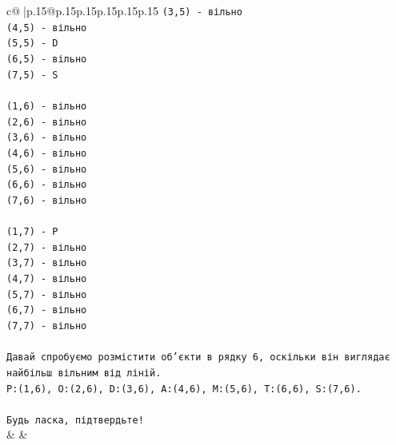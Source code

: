 \documentclass{article}
\begin{document}
{\begin{supertabular}{c@{$\;$}|p{.15\linewidth}@{}p{.15\linewidth}p{.15\linewidth}p{.15\linewidth}p{.15\linewidth}p{.15\linewidth}}
{{{\texttt{(3,5) {-} вільно} \\
\texttt{(4,5) {-} вільно} \\
\texttt{(5,5) {-} D} \\
\texttt{(6,5) {-} вільно} \\
\texttt{(7,5) {-} S} \\
\\ 
\texttt{(1,6) {-} вільно} \\
\texttt{(2,6) {-} вільно} \\
\texttt{(3,6) {-} вільно} \\
\texttt{(4,6) {-} вільно} \\
\texttt{(5,6) {-} вільно} \\
\texttt{(6,6) {-} вільно} \\
\texttt{(7,6) {-} вільно} \\
\\ 
\texttt{(1,7) {-} P} \\
\texttt{(2,7) {-} вільно} \\
\texttt{(3,7) {-} вільно} \\
\texttt{(4,7) {-} вільно} \\
\texttt{(5,7) {-} вільно} \\
\texttt{(6,7) {-} вільно} \\
\texttt{(7,7) {-} вільно} \\
\\ 
\texttt{Давай спробуємо розмістити об'єкти в рядку 6, оскільки він виглядає найбільш вільним від ліній.} \\
\texttt{P:(1,6), O:(2,6), D:(3,6), A:(4,6), M:(5,6), T:(6,6), S:(7,6).} \\
\\ 
\texttt{Будь ласка, підтвердьте!} \\
            }
        }
    }
    & & \\ \\


\end{supertabular}}
\end{document}

